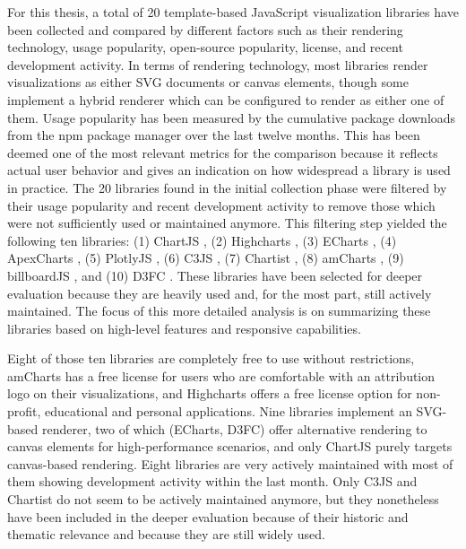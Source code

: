 For this thesis, a total of 20 template-based JavaScript visualization
libraries have been collected and compared by different factors such
as their rendering technology, usage popularity, open-source
popularity, license, and recent development activity.  In terms of
rendering technology, most libraries render visualizations as either
SVG documents or canvas elements, though some implement a hybrid
renderer which can be configured to render as either one of them.
Usage popularity has been measured by the cumulative package downloads
from the npm package manager over the last twelve months.  This has
been deemed one of the most relevant metrics for the comparison
because it reflects actual user behavior and gives an indication on
how widespread a library is used in practice.  The 20 libraries found
in the initial collection phase were filtered by their usage
popularity and recent development activity to remove those which were
not sufficiently used or maintained anymore.  This filtering step
yielded the following ten libraries: (1) ChartJS \parencite{ChartJS},
(2) Highcharts \parencite{Highcharts}, (3) ECharts
\parencite{ECharts}, (4) ApexCharts \parencite{ApexCharts}, (5)
PlotlyJS \parencite{PlotlyJS}, (6) C3JS \parencite{C3JS}, (7) Chartist
\parencite{Chartist}, (8) amCharts \parencite{amCharts}, (9)
billboardJS \parencite{billboardJS}, and (10) D3FC \parencite{D3FC}.
These libraries have been selected for deeper evaluation because they
are heavily used and, for the most part, still actively maintained.
The focus of this more detailed analysis is on summarizing these
libraries based on high-level features and responsive capabilities.

Eight of those ten libraries are completely free to use without
restrictions, amCharts has a free license for users who are
comfortable with an attribution logo on their visualizations, and
Highcharts offers a free license option for non-profit, educational
and personal applications.  Nine libraries implement an SVG-based
renderer, two of which (ECharts, D3FC) offer alternative rendering to
canvas elements for high-performance scenarios, and only ChartJS
purely targets canvas-based rendering.  Eight libraries are very
actively maintained with most of them showing development activity
within the last month.  Only C3JS and Chartist do not seem to be
actively maintained anymore, but they nonetheless have been included
in the deeper evaluation because of their historic and thematic
relevance and because they are still widely used.

